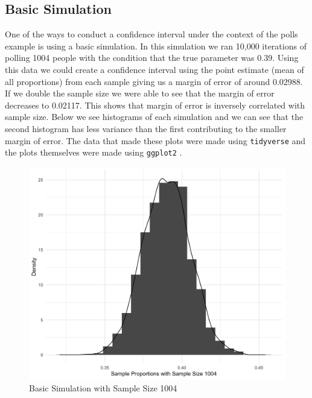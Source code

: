 \documentclass{article}\usepackage[]{graphicx}\usepackage[]{xcolor}
\begin{document}
\begin{multicols}{2}
\section{Basic Simulation}
One of the ways to conduct a confidence interval under the context of the polls example is using a basic simulation. In this simulation we ran 10,000 iterations of polling 1004 people with the condition that the true parameter was 0.39. Using this data we could create a confidence interval using the point estimate (mean of all proportions) from each sample giving us a margin of error of around 0.02988. If we double the sample size we were able to see that the margin of error decreases to 0.02117. This shows that margin of error is inversely correlated with sample size. Below we see histograms of each simulation and we can see that the second histogram has less variance than the first contributing to the smaller margin of error. The data that made these plots were made using \texttt{tidyverse} and the plots themselves were made using \texttt{ggplot2} \citep{tidyverse} \citep{ggplot}.

\begin{figure}[H]
\begin{center}
\includegraphics[scale=0.14]{first.png}
\caption{Basic Simulation with Sample Size 1004}
\label{Figure 1}
\end{center}
\end{figure}


\end{multicols}
\end{document}
